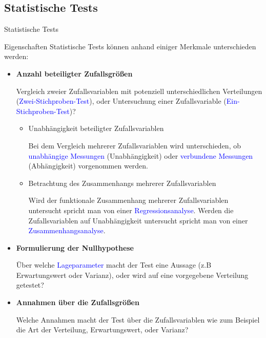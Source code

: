 \documentclass{beamer}
\def\b{\textcolor{blue}}
\begin{document}
\subsection{Statistische Tests}
\begin{frame}{Statistische Tests}
    \begin{block}{Eigenschaften}
        Statistische Tests können anhand einiger Merkmale unterschieden werden:
        \begin{itemize}
            \item \textbf{Anzahl beteiligter Zufallsgrößen}\pause\par
                Vergleich zweier Zufallsvariablen mit potenziell unterschiedlichen Verteilungen (\b{Zwei-Stichproben-Test}), oder Untersuchung einer Zufallsvariable (\b{Ein-Stichproben-Test})?\pause
                \begin{itemize}
                    \item Unabhängigkeit beteiligter Zufallsvariablen\par
                        Bei dem Vergleich mehrerer Zufallsvariablen wird unterschieden, ob \b{unabhängige Messungen} (Unabhängigkeit) oder \b{verbundene Messungen} (Abhängigkeit) vorgenommen werden.\pause
                    \item Betrachtung des Zusammenhangs mehrerer Zufallsvariablen\par
                        Wird der funktionale Zusammenhang mehrerer Zufallsvariablen untersucht spricht man von einer \b{Regressionsanalyse}. Werden die Zufallsvariablen auf Unabhängigkeit untersucht spricht man von einer \b{Zusammenhangsanalyse}.
                \end{itemize}
        \end{itemize}
    \end{block}
\end{frame}

\begin{frame}
    \begin{itemize}
        \item \textbf{Formulierung der Nullhypothese}\pause\par
            Über welche \b{Lageparameter} macht der Test eine Aussage (z.B Erwartungswert oder Varianz), oder wird auf eine vorgegebene Verteilung getestet?\pause
        \item \textbf{Annahmen über die Zufallsgrößen}\pause\par
            Welche Annahmen macht der Test über die Zufallsvariablen wie zum Beispiel die Art der Verteilung, Erwartungswert, oder Varianz?
    \end{itemize}
\end{frame}
\end{document}
